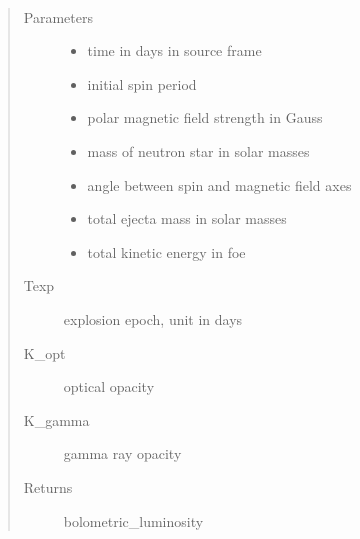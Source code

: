 \documentclass[letterpaper,10pt,english]{sphinxmanual}
\begin{document}
\begin{fulllineitems}
\label{\detokenize{generated/sdapy.models.magnetar.basic_magnetar_powered_bolometric:sdapy.models.magnetar.basic_magnetar_powered_bolometric}}~\begin{quote}\begin{description}
\item[{Parameters}] \leavevmode\begin{itemize}
\item {} 
 \textendash{} time in days in source frame

\item {} 
 \textendash{} initial spin period

\item {} 
 \textendash{} polar magnetic field strength in Gauss

\item {} 
 \textendash{} mass of neutron star in solar masses

\item {} 
 \textendash{} angle between spin and magnetic field axes

\item {} 
 \textendash{} total ejecta mass in solar masses

\item {} 
 \textendash{} total kinetic energy in foe

\end{itemize}

\item[{Texp}] \leavevmode
explosion epoch, unit in days

\item[{K\_opt}] \leavevmode
optical opacity

\item[{K\_gamma}] \leavevmode
gamma ray opacity

\item[{Returns}] \leavevmode
bolometric\_luminosity

\end{description}\end{quote}

\end{fulllineitems}
\end{document}
